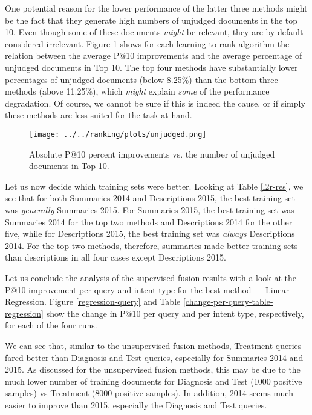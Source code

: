 One potential reason for the lower performance of the latter three methods might be the fact that they generate high
numbers of unjudged documents in the top 10. Even though some of these documents \emph{might} be relevant,
they are by default considered irrelevant.
Figure \ref{unjudged-fig} shows for each learning to rank algorithm
the relation between the average P@10 improvements and the average
percentage of unjudged documents in Top 10. The top four methods
have substantially lower percentages of unjudged documents (below 8.25\%) than the bottom
three methods (above 11.25\%), which \emph{might} explain \emph{some} of the performance degradation.
Of course, we cannot
be sure if this is indeed the cause, or if simply these methods are less suited for the task at hand.

\begin{figure}[h!]
\centerline{
  \texttt{[image: ../../ranking/plots/unjudged.png]}
  }
  \caption{Absolute P@10 percent improvements vs. the number of unjudged documents in Top 10.}
  \label{unjudged-fig}
\end{figure}

Let us now decide which training sets were better.
Looking at Table \ref{l2r-res}, we see that for both Summaries 2014 and Descriptions 2015, the best
training set was \emph{generally} Summaries 2015.
For Summaries 2015, the best training set
was Summaries 2014 for the top two methods and Descriptions 2014 for the other five,
while for Descriptions 2015, the best training set was \emph{always} Descriptions 2014.
For the top two methods, therefore, summaries made better training sets than descriptions in all
four cases except Descriptions 2015.

Let us conclude the analysis of the supervised fusion results with a look at the P@10 improvement per query
and intent type
for the best method --- Linear Regression. Figure \ref{regression-query} and Table
\ref{change-per-query-table-regression} show the change in P@10
per query and per intent type, respectively, for each of the four runs.

We can see that, similar to the unsupervised fusion methods,
Treatment queries fared better than Diagnosis and Test queries, especially for Summaries 2014 and 2015.
As discussed for the unsupervised fusion methods, this may be due to the much lower number of training
documents for Diagnosis and Test (1000 positive samples) vs Treatment (8000 positive samples).
In addition, 2014 seems much easier to improve than 2015, especially the Diagnosis and Test queries.

